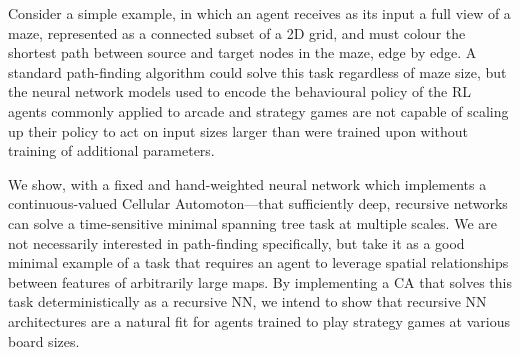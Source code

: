 \documentclass{article}
\begin{document}

Consider a simple example, in which an agent receives as its input a full view of a maze, represented as a connected subset of a 2D grid, and must colour the shortest path between source and target nodes in the maze, edge by edge.
A standard path-finding algorithm could solve this task regardless of maze size, but the neural network models used to encode the behavioural policy of the RL agents commonly applied to arcade and strategy games are not capable of scaling up their policy to act on input sizes larger than were trained upon without training of additional parameters. 

We show, with a fixed and hand-weighted neural network which implements a continuous-valued Cellular Automoton---that sufficiently deep, recursive networks can solve a time-sensitive minimal spanning tree task at multiple scales. %
We are not necessarily interested in path-finding specifically, but take it as a good minimal example of a task that requires an agent to leverage spatial relationships between features of arbitrarily large maps.
By implementing a CA that solves this task deterministically as a recursive NN, we intend to show that recursive NN architectures are a natural fit for agents trained to play strategy games at various board sizes. 
\end{document}
